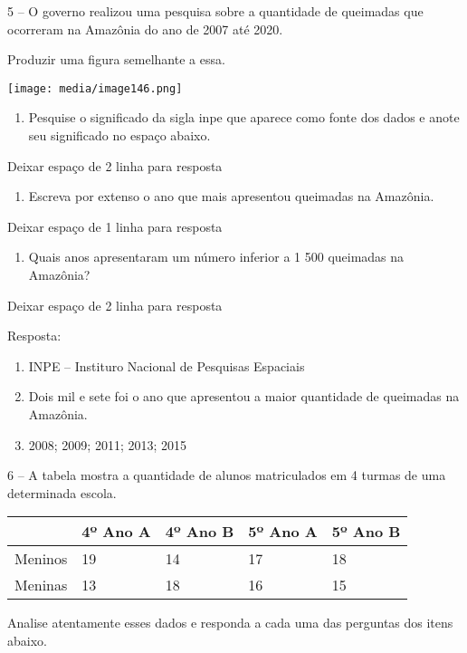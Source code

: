 5 -- O governo realizou uma pesquisa sobre a quantidade de queimadas que
ocorreram na Amazônia do ano de 2007 até 2020.

Produzir uma figura semelhante a essa.

\texttt{[image: media/image146.png]}

\begin{enumerate}
\def\labelenumi{\alph{enumi})}
\item
  Pesquise o significado da sigla inpe que aparece como fonte dos dados
  e anote seu significado no espaço abaixo.
\end{enumerate}

Deixar espaço de 2 linha para resposta

\begin{enumerate}
\def\labelenumi{\alph{enumi})}
\item
  Escreva por extenso o ano que mais apresentou queimadas na Amazônia.
\end{enumerate}

Deixar espaço de 1 linha para resposta

\begin{enumerate}
\def\labelenumi{\alph{enumi})}
\item
  Quais anos apresentaram um número inferior a 1 500 queimadas na
  Amazônia?
\end{enumerate}

Deixar espaço de 2 linha para resposta

Resposta:

\begin{enumerate}
\def\labelenumi{\alph{enumi})}
\item
  INPE -- Instituro Nacional de Pesquisas Espaciais
\item
  Dois mil e sete foi o ano que apresentou a maior quantidade de
  queimadas na Amazônia.
\item
  2008; 2009; 2011; 2013; 2015
\end{enumerate}

6 -- A tabela mostra a quantidade de alunos matriculados em 4 turmas de
uma determinada escola.

\begin{longtable}[]{@{}lllll@{}}
\toprule
& 4º Ano A & 4º Ano B & 5º Ano A & 5º Ano B\tabularnewline
\midrule
\endhead
Meninos & 19 & 14 & 17 & 18\tabularnewline
Meninas & 13 & 18 & 16 & 15\tabularnewline
\bottomrule
\end{longtable}

Analise atentamente esses dados e responda a cada uma das perguntas dos
itens abaixo.

